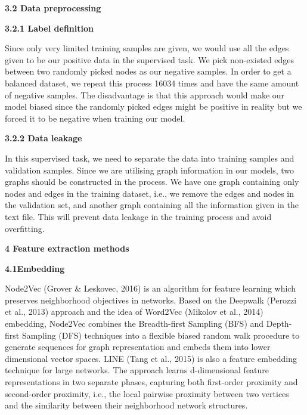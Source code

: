 \documentclass[12pt]{article}
\renewcommand{\_}{\kern-1.5pt\textunderscore\kern-1.5pt}
\begin{document}
\begin{justify}
\textbf{3.2 Data preprocessing}
\end{justify}
\begin{justify}
\textbf{3.2.1 Label definition}
\end{justify}
\begin{justify}
Since only very limited training samples are given, we would use all the edges given to be our positive data in the supervised task. We pick non-existed edges between two randomly picked nodes as our negative samples. In order to get a balanced dataset, we repeat this process 16034 times and have the same amount of negative samples. The disadvantage is that this approach would make our model biased since the randomly picked edges might be positive in reality but we forced it to be negative when training our model. 
\end{justify}
\begin{justify}
\textbf{3.2.2 Data leakage}
\end{justify}
\begin{justify}
In this supervised task, we need to separate the data into training samples and validation samples. Since we are utilising graph information in our models, two graphs should be constructed in the process. We have one graph containing only nodes and edges in the training dataset, i.e., we remove the edges and nodes in the validation set, and another graph containing all the information given in the text file. This will prevent data leakage in the training process and avoid overfitting. 
\end{justify}
\setlength{\parskip}{6.0pt}
\begin{justify}
{\fontsize{13pt}{15.6pt}\selectfont \textbf{4 Feature extraction methods }}
\end{justify}
\setlength{\parskip}{3.0pt}
\begin{justify}
\textbf{4.1Embedding}
\end{justify}
\begin{justify}
Node2Vec (Grover $\&$  Leskovec, 2016) is an algorithm for feature learning which preserves neighborhood objectives in networks. Based on the Deepwalk (\textcolor[HTML]{222222}{Perozzi et al., 2013}) approach and the idea of Word2Vec (\textcolor[HTML]{222222}{Mikolov et al., 2014}) embedding, Node2Vec combines the Breadth-first Sampling (BFS) and Depth-first Sampling (DFS) techniques into a flexible biased random walk procedure to generate sequences for graph representation and embeds them into lower dimensional vector spaces. LINE (Tang et al., 2015) is also a feature embedding technique for large networks. The approach learns d-dimensional feature representations in two separate phases, capturing both first-order proximity and second-order proximity, i.e., the local pairwise proximity between two vertices and the similarity between their neighborhood network structures. 
\end{justify}
\end{document}
